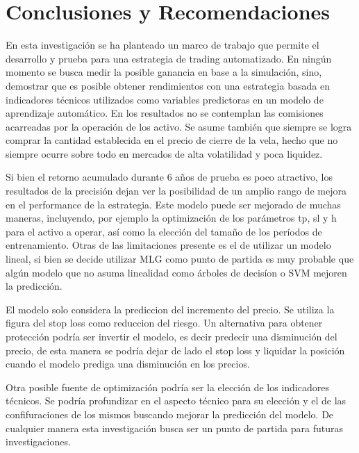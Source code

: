 \documentclass[a4paper,12pt]{Latex/Classes/PhDthesisPSnPDF}
\begin{document}

\chapter*{Conclusiones y Recomendaciones}

En esta investigación se ha planteado un marco de trabajo que permite el desarrollo y prueba para una estrategia de trading automatizado. En ningún momento se busca medir la posible ganancia en base a la simulación, sino, demostrar que es posible obtener rendimientos con una estrategia basada en indicadores técnicos utilizados como variables predictoras en un modelo de aprendizaje automático. En los resultados no se contemplan las comisiones acarreadas por la operación de los activo. Se asume también que siempre se logra comprar la cantidad establecida en el precio de cierre de la vela, hecho que no siempre ocurre sobre todo en mercados de alta volatilidad y poca liquidez.

Si bien el retorno acumulado durante 6 años de prueba es poco atractivo, los resultados de la precisión dejan ver la posibilidad de un amplio rango de mejora en el performance de la estrategia. Este modelo puede ser mejorado de muchas maneras, incluyendo, por ejemplo la optimización de los parámetros tp, sl y h para el activo a operar, así como la elección del tamaño de los períodos de entrenamiento. Otras de las limitaciones presente es el de utilizar un modelo lineal, si bien se decide utilizar MLG como punto de partida es muy probable que algún modelo que no asuma linealidad como árboles de decisíon o SVM mejoren la predicción. 

El modelo solo considera la prediccion del incremento del precio. Se utiliza la figura del stop loss como reduccion del riesgo. Un alternativa para obtener protección podría ser invertir el modelo, es decir predecir una disminución del precio, de esta manera se podría dejar de lado el stop loss y liquidar la posición cuando el modelo prediga una disminución en los precios.

Otra posible fuente de optimización podría ser la elección de los indicadores técnicos. Se podría profundizar en el aspecto técnico para su elección y el de las confifuraciones de los mismos buscando mejorar la predicción del modelo. De cualquier manera esta investigación busca ser un punto de partida para futuras investigaciones.


\end{document}
